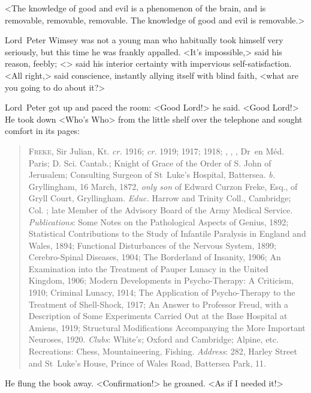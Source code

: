 <The knowledge of good and evil is a phenomenon of the brain, and is removable, removable, removable. The knowledge of good and evil is removable.>

Lord~Peter Wimsey was not a young man who habitually took himself very seriously, but this time he was frankly appalled. <It's impossible,> said his reason, feebly; <> said his interior certainty with impervious self-satisfaction. <All right,> said conscience, instantly allying itself with blind faith, <what are you going to do about it?>

Lord~Peter got up and paced the room: <Good Lord!> he said. <Good Lord!> He took down <Who's Who> from the little shelf over the telephone and sought comfort in its pages:

\begin{quote}
\textsc{Freke}, Sir Julian, Kt. \textit{cr.} 1916;  \textit{cr.} 1919;  1917;  1918; , , , Dr~en Méd. Paris; D\@. Sci. Cantab.; Knight of Grace of the Order of S\@. John of Jerusalem; Consulting Surgeon of St~Luke's Hospital, Battersea. \textit{b.} Gryllingham, 16 March, 1872, \textit{only son} of Edward Curzon Freke, Esq., of Gryll Court, Gryllingham. \textit{Educ.} Harrow and Trinity Coll., Cambridge; Col. ; late Member of the Advisory Board of the Army Medical Service. \textit{Publications}: Some Notes on the Pathological Aspects of Genius, 1892; Statistical Contributions to the Study of Infantile Paralysis in England and Wales, 1894; Functional Disturbances of the Nervous System, 1899; Cerebro-Spinal Diseases, 1904; The Borderland of Insanity, 1906; An Examination into the Treatment of Pauper Lunacy in the United Kingdom, 1906; Modern Developments in Psycho-Therapy: A Criticism, 1910; Criminal Lunacy, 1914; The Application of Psycho-Therapy to the Treatment of Shell-Shock, 1917; An Answer to Professor Freud, with a Description of Some Experiments Carried Out at the Base Hospital at Amiens, 1919; Structural Modifications Accompanying the More Important Neuroses, 1920. \textit{Clubs}: White's; Oxford and Cambridge; Alpine, etc. Recreations: Chess, Mountaineering, Fishing. \textit{Address}: 282, Harley Street and St~Luke's House, Prince of Wales Road, Battersea Park, 11.
\end{quote}

He flung the book away. <Confirmation!> he groaned. <As if I needed it!>


